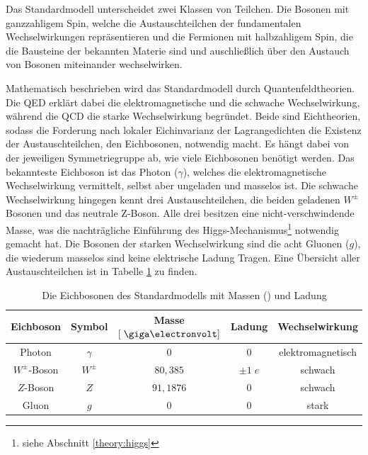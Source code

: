 Das Standardmodell unterscheidet zwei Klassen von Teilchen. Die Bosonen mit
ganzzahligem Spin, welche die Austauschteilchen der fundamentalen
Wechselwirkungen repräsentieren und die Fermionen mit halbzahligem Spin, die
die Bausteine der bekannten Materie sind und auschließlich über den Austauch
von Bosonen miteinander wechselwirken.  

Mathematisch beschrieben wird das Standardmodell durch Quantenfeldtheorien. Die
\ac{QED} erklärt dabei die elektromagnetische und die schwache Wechselwirkung,
während die \ac{QCD} die starke Wechselwirkung begründet. Beide sind
Eichtheorien, sodass die Forderung nach lokaler Eichinvarianz der
Lagrangedichten die Existenz der Austauschteilchen, den Eichbosonen, notwendig
macht. Es hängt dabei von der jeweiligen Symmetriegruppe ab, wie viele
Eichbosonen benötigt werden. Das bekannteste Eichboson ist das Photon
($\gamma$), welches die elektromagnetische Wechselwirkung vermittelt, selbst
aber ungeladen und masselos ist. Die schwache Wechselwirkung hingegen kennt
drei Austauschteilchen, die beiden geladenen $W^\pm$ Bosonen und das neutrale
Z-Boson. Alle drei besitzen eine nicht-verschwindende Masse, was die
nachträgliche Einführung des Higgs-Mechanismus\footnote{siehe Abschnitt
\ref{theory:higgs}} notwendig gemacht hat. Die Bosonen der starken
Wechselwirkung sind die acht Gluonen ($g$), die wiederum masselos sind keine
elektrische Ladung Tragen. Eine Übersicht aller Austauschteilchen ist in
Tabelle \ref{tab:bosons} zu finden.

\begin{table}[h]
    \centering
    \begin{tabular}{|c|c|c|c|c|}
        \hline
        \bf{Eichboson} & \bf{Symbol} & \bf{Masse} $[\GeV]$ & \bf{Ladung} &
        \bf{Wechselwirkung} \\
        \hline\hline
        Photon        & $\gamma$ & $0$       & $0$        & elektromagnetisch \\
        $W^\pm$-Boson & $W^\pm$  & $80,385 $ & $\pm 1\;e$ & schwach \\
        $Z$-Boson     & $Z$      & $91,1876$ & $0$        & schwach \\
        Gluon         & $g$      & $0$       & $0$        & stark \\
        \hline
    \end{tabular}
    \caption[Die Eichbosonen des Standardmodells]
        {Die Eichbosonen des Standardmodells mit Massen
        (\cite{PhysRevD.86.010001}) und Ladung}
    \label{tab:bosons}
\end{table}

